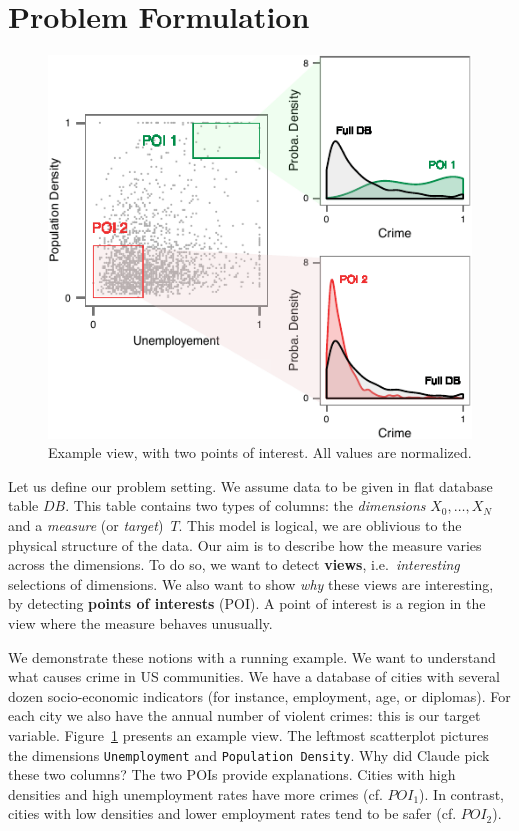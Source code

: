 \section{Problem Formulation}
\label{sec:presentation}
\begin{figure}[t!]
\centering
\includegraphics[width=\columnwidth]{images/Overview}
\caption{Example view, with two points of interest. All values
are normalized.}
\label{fig:overview}
\end{figure}
Let us define our problem setting. We assume data to be given in flat database table $DB$. This
table contains two types of columns: the \emph{dimensions} $X_0, \ldots, X_N$
and a \emph{measure} (or \emph{target})~$T$. This model is logical, we
are oblivious to the physical structure of the data. Our aim is to describe how
the measure varies across the dimensions. To do so, we want to detect
\textbf{views}, i.e.\ \emph{interesting} selections of dimensions. We also
want to show \emph{why} these views are interesting, by detecting
\textbf{points of interests} (POI). A point of interest is a region in the view
where the measure behaves unusually.

We demonstrate these notions with a running example. We want to understand what
causes crime in US communities. We have a database of cities with several dozen
socio-economic indicators (for instance, employment, age, or diplomas). For
each city we also have the annual number of violent crimes: this is our target
variable. Figure~\ref{fig:overview} presents an example view. The leftmost
scatterplot pictures the dimensions \texttt{Unemployment} and
\texttt{Population Density}. Why did Claude pick these two columns? The two
POIs provide explanations. Cities with high densities and high unemployment
rates have more crimes (cf. $POI_1$).  In contrast, cities with low densities
and lower employment rates tend to be safer (cf.  $POI_2$).

